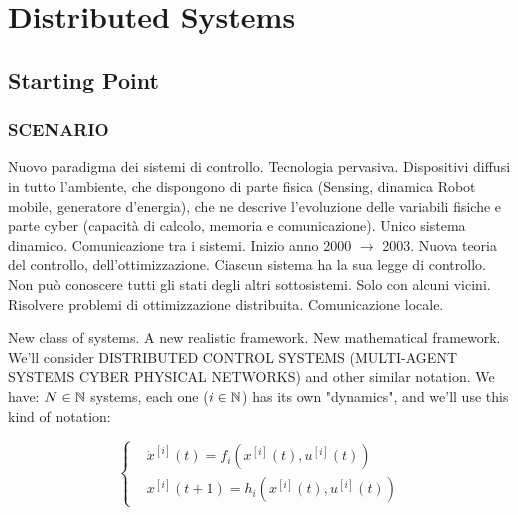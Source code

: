 
\chapter{Distributed Systems}
\label{cap:distsys}

\section{Starting Point}

\subsection{SCENARIO}

Nuovo paradigma dei sistemi di controllo. Tecnologia pervasiva. Dispositivi diffusi in tutto l'ambiente, che dispongono di parte fisica (Sensing, dinamica Robot mobile, generatore d'energia), che ne descrive l'evoluzione delle variabili fisiche e parte cyber (capacità di calcolo, memoria e comunicazione). Unico sistema dinamico. Comunicazione tra i sistemi. Inizio anno 2000 $\rightarrow$ 2003. Nuova teoria del controllo, dell'ottimizzazione. Ciascun sistema ha la sua legge di controllo. Non può conoscere tutti gli stati degli altri sottosistemi. Solo con alcuni vicini. Risolvere problemi di ottimizzazione distribuita. Comunicazione locale.

New class of systems. A new realistic framework. New mathematical framework. We'll consider DISTRIBUTED CONTROL SYSTEMS (MULTI-AGENT SYSTEMS CYBER PHYSICAL NETWORKS) and other similar notation. We have: $N \in \mathbb{N}$ systems, each one ($i \in \mathbb{N}$) has its own "dynamics", and we'll use this kind of notation:

\[ 
	\left\{
	\begin{aligned}
	&\dot{x}^{[i]}(t) = f_i(x^{[i]}(t), u^{[i]}(t)) \\
	&x^{[i]}(t+1) = h_i(x^{[i]}(t), u^{[i]}(t))
	\end{aligned} 
	\right.
\]

